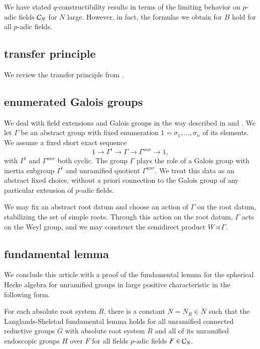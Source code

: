 \begin{remark}  We have stated $q$-constructibility results in terms of the limiting behavior on
$p$-adic fields $\mathcal C_N$ for $N$ large.  However, in fact, the formulas we obtain for $B$  hold for all
$p$-adic fields.
\end{remark}




\subsection{transfer principle}

We review the transfer principle from \cite{cluckers2010constructible}.

\subsection{enumerated Galois groups}

We deal with field extensions and Galois groups in the way described in \cite{gordon} and \cite{cluckers2011transfer}.
We let $\Gamma$ be an abstract group with fixed enumeration $1=\sigma_1,\ldots,\sigma_n$ of its elements.  We
assume a fixed short exact sequence
\[
1\to \Gamma^t\to\Gamma\to\Gamma^{unr}\to 1,
\]
with $\Gamma^t$ and $\Gamma^{unr}$ both cyclic.
The group $\Gamma$ plays the role of a Galois group with inertia subgroup $\Gamma^t$ and unramified quotient $\Gamma^{unr}$.
We treat this data as an abstract fixed choice, without a priori connection to the Galois group of any particular extension of 
$p$-adic fields.  

We may fix an abstract root datum and choose an action of $\Gamma$ on the root datum, stabilizing the set of simple roots.
Through this action on the root datum, $\Gamma$ acts on the Weyl group, and we may construct the semidirect product $W\rtimes \Gamma$.


\subsection{fundamental lemma}

We conclude this article with a proof of the fundamental lemma for the spherical Hecke algebra for unramified groups in large positive characteristic
in the following form.

\begin{theorem}  \label{thm:fl}
For each absolute root system $R$,
there is a constant $N=N_R\in\ring{N}$ such that
the Langlands-Shelstad fundamental lemma holds for all unramified connected reductive groups $G$ with absolute root system $R$ 
and all of its unramified endoscopic groups $H$ over $F$ 
for all fields $p$-adic fields $F\in \mathcal C_N$.
\end{theorem}

